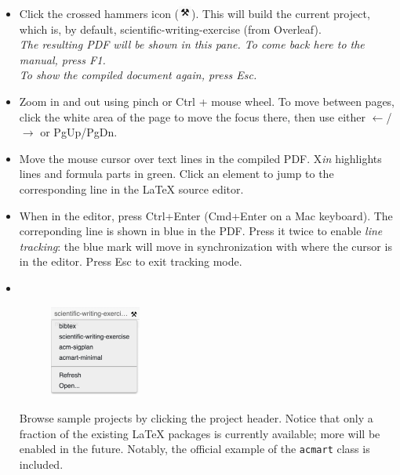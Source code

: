 \documentclass{article}
\newcommand\ToXin{\raisebox{0.5pt}{T}\hspace{-.8pt}\raisebox{1pt}{o}\hspace{-1pt}X{\hspace{-1pt}\itshape in}}
\begin{document}
\begin{itemize}
\item Click the crossed hammers icon
 (\includegraphics[width=12pt,valign=t]{gfx/button-build.png}).
 This will build the current project,
 which is, by default, \textsf{scientific-writing-exercise} (from Overleaf). \\[.2em]
 \textit{The resulting PDF will be shown in this pane. To come back here to the manual, press {\rm F1}.}\\[.2em]
 \textit{To show the compiled document again, press {\rm Esc}.}

 
\item Zoom in and out using pinch or Ctrl + mouse wheel.
To move between pages, click the white area of the page to move the focus there,
then use either $\leftarrow$/$\rightarrow$
or PgUp/PgDn.
 
\item Move the mouse cursor over text lines in the compiled PDF.
{\ToXin} highlights lines and formula parts in green.
Click an element to jump to the corresponding line in the {\LaTeX} source editor.

\item When in the editor, press Ctrl+Enter (Cmd+Enter on a Mac keyboard).
The correponding line is shown in blue in the PDF.
Press it twice to enable \emph{line tracking}: the blue mark will move in synchronization with where the cursor is in the editor.
Press Esc to exit tracking mode.

\item 
\begin{minipage}[t]{3.5in}
~
\begin{figure}
\vspace{-2.7em}
\includegraphics[width=3cm]{gfx/project-dropdown.png}
\end{figure}
\vspace{-2.4em}

Browse sample projects by clicking the project header.
Notice that only a fraction of the existing
{\LaTeX} packages is currently available;
more will be enabled in the future.
Notably, the official example of the
\texttt{acmart} class is included.
\end{minipage}


\end{itemize}
\end{document}
